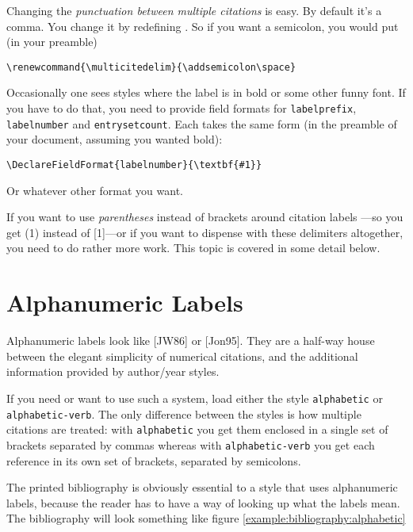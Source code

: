Changing the \emph{punctuation between multiple citations} is easy. By
default it's a comma. You change it by redefining
. So
if you want a semicolon, you would put (in your preamble)
\begin{center}
\verb|\renewcommand{\multicitedelim}{\addsemicolon\space}|
\end{center}

Occasionally one sees styles where the label is in bold or some other
funny font. If you have to do that, you need to provide field formats
for \verb|labelprefix|, \verb|labelnumber| and
\verb|entrysetcount|. Each takes the same form (in the preamble of
your document, assuming you wanted bold):
\begin{center}
\verb|\DeclareFieldFormat{labelnumber}{\textbf{#1}}|
\end{center}
Or whatever other format you want.

If you want to use \emph{parentheses} instead of brackets around
citation labels ---so you get (1) instead of [1]---or if you want to
dispense with these delimiters altogether, you need to do rather more
work. This topic is covered in some detail below.
\section{Alphanumeric Labels}

Alphanumeric labels look like [JW86] or [Jon95]. They are a half-way
house between the elegant simplicity of numerical citations, and the
additional information provided by author/year styles.

If you need or want to use such a system, load either the style
\verb|alphabetic| or \verb|alphabetic-verb|. The only difference
between the styles is how multiple citations are treated: with
\verb|alphabetic| you get them enclosed in a single set of
brackets separated by
commas whereas with \verb|alphabetic-verb| you get each reference in
its own set of brackets, separated by
semicolons.

The printed bibliography is obviously essential to a style that uses
alphanumeric labels, because the reader has to have a way of looking
up what the labels mean. The bibliography will look something like
figure \ref{example:bibliography:alphabetic}


